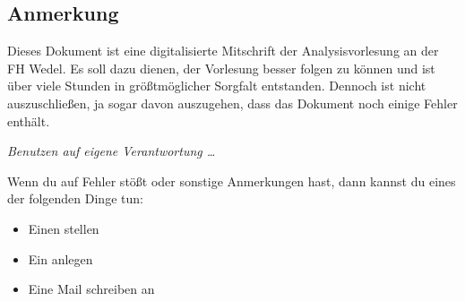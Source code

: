 \subsection*{Anmerkung}

Dieses Dokument ist eine digitalisierte Mitschrift der Analysisvorlesung an der FH Wedel. Es soll dazu dienen, der Vorlesung besser folgen zu können und ist über viele Stunden in größtmöglicher Sorgfalt entstanden. Dennoch ist nicht auszuschließen, ja sogar davon auszugehen, dass das Dokument noch einige Fehler enthält.

\bigskip
\textit{Benutzen auf eigene Verantwortung \ldots}
\bigskip

Wenn du auf Fehler stößt oder sonstige Anmerkungen hast, dann kannst du eines der folgenden Dinge tun:
\begin{itemize}
	\item Einen  stellen
	\item Ein  anlegen
	\item Eine Mail schreiben an 
\end{itemize}
